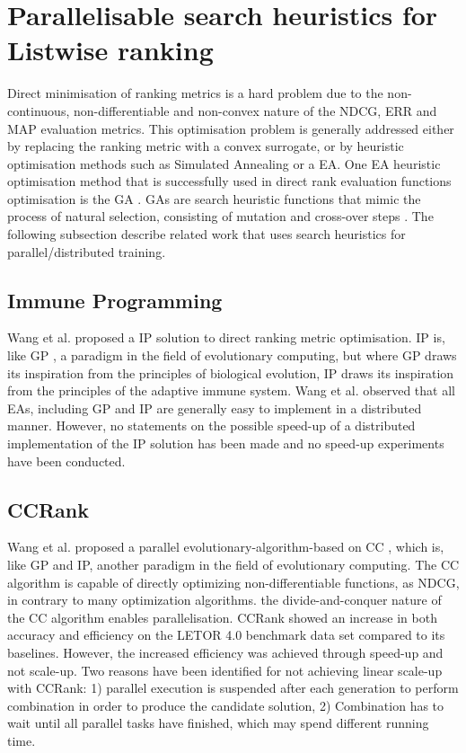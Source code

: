 \section{Parallelisable search heuristics for Listwise ranking}
Direct minimisation of ranking metrics is a hard problem due to the non-continuous, non-differentiable and non-convex nature of the \ac{NDCG}, \ac{ERR} and \ac{MAP} evaluation metrics. This optimisation problem is generally addressed either by replacing the ranking metric with a convex surrogate, or by heuristic optimisation methods such as Simulated Annealing or a \ac{EA}. One \ac{EA} heuristic optimisation method that is successfully used in direct rank evaluation functions optimisation is the \ac{GA} \cite{Yeh2007}. \ac{GA}s are search heuristic functions that mimic the process of natural selection, consisting of mutation and cross-over steps \cite{Holland1995}. The following subsection describe related work that uses search heuristics for parallel/distributed training.
\subsection{Immune Programming}
Wang et al. \cite{Wang2009b} proposed a \ac{IP} solution to direct ranking metric optimisation. \ac{IP} \cite{Musilek2006} is, like \ac{GP} \cite{Koza1992}, a paradigm in the field of evolutionary computing, but where \ac{GP} draws its inspiration from the principles of biological evolution, \ac{IP} draws its inspiration from the principles of the adaptive immune system. Wang et al. \cite{Wang2009b} observed that all \ac{EA}s, including \ac{GP} and \ac{IP} are generally easy to implement in a distributed manner. However, no statements on the possible speed-up of a distributed implementation of the \ac{IP} solution has been made and no speed-up experiments have been conducted.
\subsection{CCRank}
Wang et al. \cite{Wang2011a,Wang2011b} proposed a parallel evolutionary-algorithm-based on \ac{CC} \cite{Potter2000}, which is, like \ac{GP} and \ac{IP}, another paradigm in the field of evolutionary computing. The \ac{CC} algorithm is capable of directly optimizing non-differentiable functions, as \ac{NDCG}, in contrary to many optimization algorithms.  the divide-and-conquer nature of the \ac{CC} algorithm enables parallelisation. CCRank showed an increase in both accuracy and efficiency on the LETOR 4.0 benchmark data set compared to its baselines. However, the increased efficiency was achieved through speed-up and not scale-up. Two reasons have been identified for not achieving linear scale-up with CCRank: 1) parallel execution is suspended after each generation to perform combination in order to produce the candidate solution, 2) Combination has to wait until all parallel tasks have finished, which may spend different running time.
